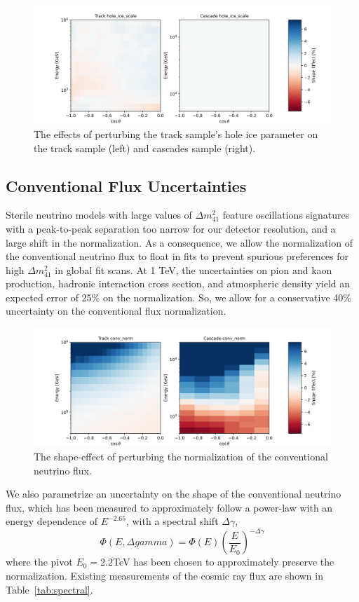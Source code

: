 \documentclass[main.tex]{subfiles}
\begin{document}
\begin{figure}
    \centering
    \includegraphics[width=0.8\linewidth]{figures/systematics/hole_ice_scale.png}
    \caption{The effects of perturbing the track sample's hole ice parameter on the track sample (left) and cascades sample (right).}\label{fig:track_hole}
\end{figure}

\subsection{Conventional Flux Uncertainties}\label{sec:barr_hg}
Sterile neutrino models with large values of $\Delta m_{41}^{2}$ feature oscillations signatures with a peak-to-peak separation too narrow for our detector resolution, and a large shift in the normalization. 
As a consequence, we allow the normalization of the conventional neutrino flux to float in fits to prevent spurious preferences for high $\Delta m_{41}^{2}$ in global fit scans. 
At 1 TeV, the uncertainties on pion and kaon production, hadronic interaction cross section, and atmospheric density yield an expected error of 25\% on the normalization\cite{Aartsen_2020_prd}. 
So, we allow for a conservative 40\% uncertainty on the conventional flux normalization.

\begin{figure}
    \centering
    \includegraphics[width=0.8\linewidth]{figures/systematics/conv_norm.png}
    \caption{The shape-effect of perturbing the normalization of the conventional neutrino flux.}
\end{figure}


We also parametrize an uncertainty on the shape of the conventional neutrino flux, which has been measured to approximately follow a power-law with an energy dependence of $E^{-2.65}$, with a spectral shift $\Delta \gamma$,
\begin{equation}
\Phi(E, \Delta gamma) = \Phi(E)\left(\dfrac{E}{E_{0}}\right)^{-\Delta\gamma}
\end{equation}
where the pivot $E_{0}=2.2$TeV has been chosen to approximately preserve the normalization. 
Existing measurements of the cosmic ray flux are shown in Table~\ref{tab:spectral}. 
\end{document}
